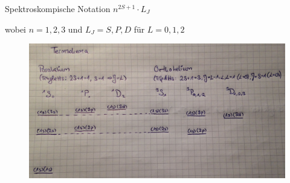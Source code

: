 Spektroskompische Notation $n^{2 S + 1} \cdot L_J$

wobei $n=1,2,3$ und $L_J = S, P, D$ für $L=0, 1, 2$

	\begin{figure} [h]
		\begin{center}
				\includegraphics[width=\textwidth]{Termschema}
		\end{center}
	\end{figure}

